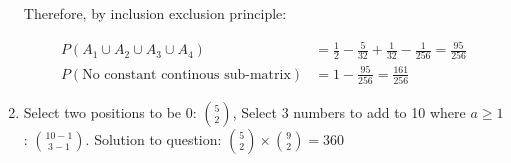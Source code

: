 \documentclass{article}
\begin{document}
\begin{enumerate}[label=(\alph*)]
          Therefore, by inclusion exclusion principle:

          \begin{align*}
              P(A_1 \cup A_2 \cup A_3 \cup A_4)          & = \frac12 - \frac{5}{32} + \frac{1}{32} - \frac{1}{256} = \frac{95}{256} \\
              P(\text{No constant continous sub-matrix}) & = 1 - \frac{95}{256} = \frac{161}{256}
          \end{align*}

    \item Select two positions to be 0: $\binom{5}{2}$, Select 3 numbers to add to 10 where $a \geq 1$: $\binom{10-1}{3-1}$. Solution to question: $\binom{5}{2} \times \binom{9}{2} = 360$
\end{enumerate}
\end{document}
